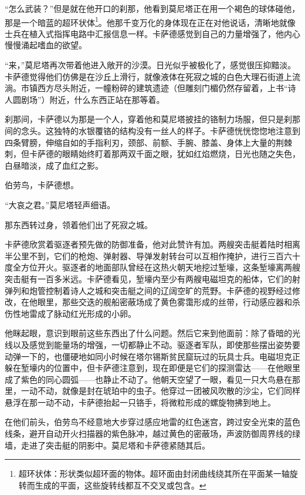 \documentclass[AutoFakeBold=true]{book}
\begin{document}
``怎么武装？''但是就在他开口的刹那，他看到莫尼塔正在用一个褐色的球体碰他，那是一个暗蓝的超环状体\footnote{超环状体：形状类似超环面的物体。超环面由封闭曲线绕其所在平面某一轴旋转而生成的平面，这些旋转线都互不交叉或包含。}。他那千变万化的身体现在正在对他说话，清晰地就像士兵在植入式指挥电路中汇报信息一样。卡萨德感觉到自己的力量增强了，他内心慢慢涌起嗜血的欲望。

``来，''莫尼塔再次带着他进入敞开的沙漠。日光似乎被极化了，感觉很压抑黯淡。卡萨德觉得他们仿佛是在沙丘上滑行，就像液体在死寂之城的白色大理石街道上流淌。市镇西方尽头附近，一幢粉碎的建筑遗迹（但雕刻门楣仍然存留着，上书``诗人圆剧场''）附近，什么东西正站在那等着。

刹那间，卡萨德以为那是一个人，穿着他和莫尼塔披挂的铬制力场服，但只是刹那间的念头。这独特的水银覆铬的结构没有一丝人的样子。卡萨德恍恍惚惚地注意到四条臂膀，伸缩自如的手指利刃，颈部、前额、手腕、膝盖、身体上大量的荆棘刺，但卡萨德的眼睛始终盯着那两双千面之眼，犹如红焰燃烧，日光也随之失色，白昼暗淡，成了血红之影。

{\kaishu 伯劳鸟}，卡萨德想。

``大哀之君。''莫尼塔轻声细语。

那东西转过身，领着他们出了死寂之城。

\vspace*{1em}

卡萨德欣赏着驱逐者预先做的防御准备，他对此赞许有加。两艘突击艇着陆时相离半公里不到，它们的枪炮、弹射器、导弹发射转台可以互相作掩护，进行三百六十度全方位开火。驱逐者的地面部队曾经在这热火朝天地挖过堑壕，这条堑壕离两艘突击艇有一百多米远。卡萨德看见，堑壕内至少有两艘电磁坦克的船体，它们的射弹列和炮管控制着诗人之城和突击艇之间的辽阔空旷的荒野。卡萨德的视野经过修改，在他眼里，那些交迭的舰船密蔽场成了黄色雾霭形成的丝带，行动感应器和杀伤性地雷成了脉动红光形成的小卵。

他眯起眼，意识到眼前这些东西出了什么问题。然后它来到他面前：除了昏暗的光线以及感觉到能量场的增强，一切都静止不动。驱逐者军队，即使那些摆出姿势要动弹一下的，也僵硬地如同小时候在塔尔锡斯贫民窟玩过的玩具士兵。电磁坦克正躲在堑壕内的位置中，但卡萨德注意到，现在即便是它们的探测雷达——在他眼里成了紫色的同心圆弧——也静止不动了。他朝天空望了一眼，看见一只大鸟悬在那里，一动不动，就像是封在琥珀中的虫子。他穿过一团被风吹散的沙尘，它们同样悬浮在那一动不动，卡萨德抬起一只铬手，将微粒形成的螺旋物拂到地上。

在他们前头，伯劳鸟不经意地大步穿过感应地雷的红色迷宫，跨过安全光束的蓝色线条，避开自动开火扫描器的紫色脉冲，越过黄色的密蔽场，声波防御周界线的绿墙，走进了突击艇的阴影中。莫尼塔和卡萨德紧随其后。
\end{document}
